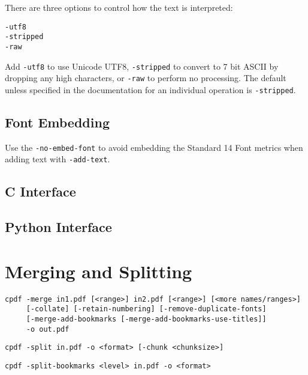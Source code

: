 \documentclass{book}
\begin{document}
\noindent There are three options to control how the text is interpreted:

\begin{framed}
  \noindent\small\verb!-utf8!\\
  \noindent\small\verb!-stripped!\\
  \noindent\small\verb!-raw!
\end{framed}

\noindent Add \verb!-utf8! to use Unicode UTF8, \verb!-stripped! to convert to 7
bit ASCII by dropping any high characters, or \verb!-raw! to perform no
processing. The default unless specified in the documentation for an individual operation is \verb!-stripped!.

\section{Font Embedding}
Use the \texttt{-no-embed-font} to avoid embedding the Standard 14 Font metrics when adding text with \texttt{-add-text}.

\begin{cpdflib}
\clearpage
\section*{C Interface}
\begin{small}\tt


\end{small}
\end{cpdflib}

\begin{pycpdflib}
\clearpage
\section*{Python Interface}
\begin{small}\tt


\end{small}
\end{pycpdflib}

\chapter{Merging and Splitting}\label{chap:2}
  \begin{framed}
  \small
  \noindent\begin{verbatim}
cpdf -merge in1.pdf [<range>] in2.pdf [<range>] [<more names/ranges>]
     [-collate] [-retain-numbering] [-remove-duplicate-fonts]
     [-merge-add-bookmarks [-merge-add-bookmarks-use-titles]]
     -o out.pdf\end{verbatim}

  \vspace{1.5mm}
  \noindent\verb!cpdf -split in.pdf -o <format> [-chunk <chunksize>]!

  \vspace{1.5mm}
  \noindent\verb!cpdf -split-bookmarks <level> in.pdf -o <format>!
  \end{framed}
\end{document}
